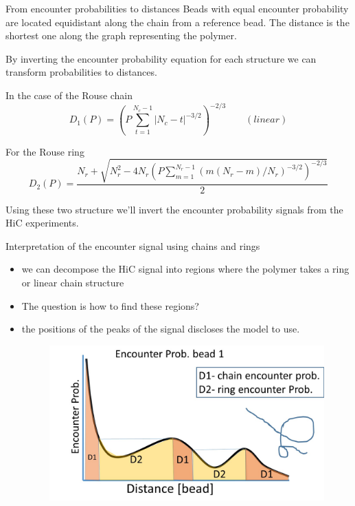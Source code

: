 \documentclass[8pt]{beamer}
\begin{document}
\begin{frame}{From encounter probabilities to distances}
Beads with equal encounter probability are located equidistant along the chain from a reference bead. 
The distance is the shortest one along the graph representing the polymer.

By inverting the encounter probability equation for each structure we can transform probabilities to distances. 

In the case of the Rouse chain 
\begin{equation*}
D_1(P) = \left(P\sum_{t=1}^{N_c-1}|N_c-t|^{-3/2}\right)^{-2/3} \qquad (linear)
\end{equation*}

For the Rouse ring 
\begin{equation*}
D_2(P) =  \frac{N_r+\sqrt{N_r^2-4N_r\left(P\displaystyle\sum_{m=1}^{N_r-1}(m(N_r-m)/N_r)^{-3/2}\right)^{-2/3}}}{2}
\end{equation*}

Using these two structure we'll invert the encounter probability signals from the HiC experiments. 

\end{frame}

\begin{frame}{Interpretation of the encounter signal using chains and rings}
\begin{itemize}
\item we can decompose the HiC signal into regions where the polymer takes a ring or linear chain structure
\item The question is how to find these regions?
\item the positions of the peaks of the signal discloses the model to use.
\begin{figure}[H]
\includegraphics[scale=0.2]{polymerReconstructionTheoreticalApproach}
\end{figure}
\end{itemize}
\end{frame}
\end{document}

